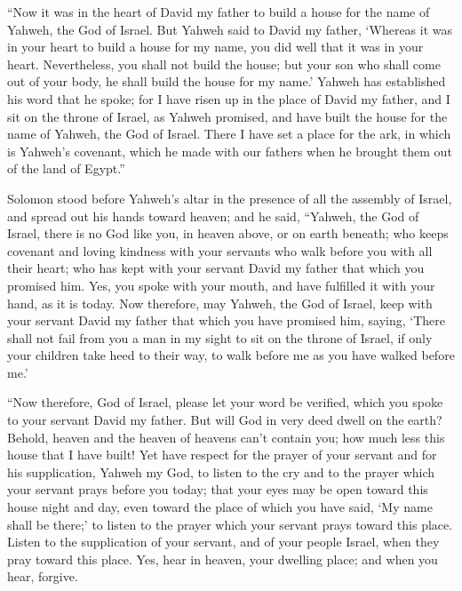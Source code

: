 \begin{paracol}{2}
\begin{otherlanguage}{english}
 ``Now it was in the heart of David my father to build a
house for the name of Yahweh, the God of Israel.  But
Yahweh said to David my father, `Whereas it was in your heart to build a
house for my name, you did well that it was in your heart.
 Nevertheless, you shall not build the house; but your
son who shall come out of your body, he shall build the house for my
name.'  Yahweh has established his word that he spoke;
for I have risen up in the place of David my father, and I sit on the
throne of Israel, as Yahweh promised, and have built the house for the
name of Yahweh, the God of Israel.  There I have set a
place for the ark, in which is Yahweh's covenant, which he made with our
fathers when he brought them out of the land of Egypt.''

 Solomon stood before Yahweh's altar in the presence of
all the assembly of Israel, and spread out his hands toward heaven;
 and he said, ``Yahweh, the God of Israel, there is no
God like you, in heaven above, or on earth beneath; who keeps covenant
and loving kindness with your servants who walk before you with all
their heart;  who has kept with your servant David my
father that which you promised him. Yes, you spoke with your mouth, and
have fulfilled it with your hand, as it is today.  Now
therefore, may Yahweh, the God of Israel, keep with your servant David
my father that which you have promised him, saying, `There shall not
fail from you a man in my sight to sit on the throne of Israel, if only
your children take heed to their way, to walk before me as you have
walked before me.'

 ``Now therefore, God of Israel, please let your word be
verified, which you spoke to your servant David my father.
 But will God in very deed dwell on the earth? Behold,
heaven and the heaven of heavens can't contain you; how much less this
house that I have built!  Yet have respect for the prayer
of your servant and for his supplication, Yahweh my God, to listen to
the cry and to the prayer which your servant prays before you today;
 that your eyes may be open toward this house night and
day, even toward the place of which you have said, `My name shall be
there;' to listen to the prayer which your servant prays toward this
place.  Listen to the supplication of your servant, and
of your people Israel, when they pray toward this place. Yes, hear in
heaven, your dwelling place; and when you hear, forgive.


\end{otherlanguage}
\end{paracol}
